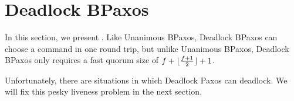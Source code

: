 \section{Deadlock BPaxos}
In this section, we present . Like Unanimous BPaxos,
Deadlock BPaxos can choose a command in one round trip, but unlike Unanimous
BPaxos, Deadlock BPaxos only requires a fast quorum size of $f + \lfloor\frac{f + 1}{2}\rfloor + 1$.

Unfortunately, there are situations in which Deadlock Paxos can deadlock.
We will fix this pesky liveness problem in the next section.


%
%
%
